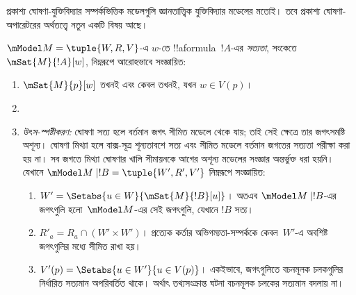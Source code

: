 \documentclass[../../../include/open-logic-section]{subfiles}
\begin{document}


প্রকাশ্য ঘোষণা-যুক্তিবিদ্যার সম্পর্কভিত্তিক মডেলগুলি জ্ঞানতাত্ত্বিক যুক্তিবিদ্যার মডেলের মতোই। তবে প্রকাশ্য ঘোষণা-অপারেটরের অর্থতত্ত্বে নতুন একটি বিষয় আছে।

\begin{defn} $\mModel M = \tuple{W, R, V}$-এ $w$-তে !!a{formula}~$!A$-এর \emph{সত্যতা}, সংকেতে
  $\mSat{M}{!A}[w]$, নিম্নরূপে আরোহভাবে সংজ্ঞায়িত:
  \begin{enumerate}
  \item $\mSat{M}{p}[w]$ তখনই এবং কেবল তখনই, যখন $w \in V(p)$।
  \item{}
  \item{}

  \emph{উৎস-স্পষ্টীকরণ:} ঘোষণা সত্য হলে বর্তমান জগৎ সীমিত মডেলে থেকে যায়; তাই সেই ক্ষেত্রে তার জগৎসমষ্টি অশূন্য। ঘোষণা মিথ্যা হলে বাক্স-সূত্র শূন্যতাবশে সত্য এবং সীমিত মডেলে বর্তমান জগতের সত্যতা পরীক্ষা করা হয় না। সব জগতে মিথ্যা ঘোষণার খালি সীমায়নকে আগের অশূন্য মডেলের সংজ্ঞার অন্তর্ভুক্ত ধরা হয়নি।
    যেখানে $\mModel M \mid !B = \tuple{W', R', V'}$ নিম্নরূপে সংজ্ঞায়িত:
  \begin{enumerate}
    \item $W' = \Setabs{ u \in W}{\mSat{M}{!B}[u]}$। অতএব $\mModel M \mid !B$-এর জগৎগুলি হলো~$\mModel M$-এর সেই জগৎগুলি, যেখানে $!B$ সত্য।
    \item $R'_a = R_a \cap (W' \times W')$। প্রত্যেক কর্তার অভিগম্যতা-সম্পর্ককে কেবল~$W'$-এ অবশিষ্ট জগৎগুলির মধ্যে সীমিত রাখা হয়।
    \item $V'(p) = \Setabs{ u \in W'}{u \in V(p) }$। একইভাবে, জগৎগুলিতে বচনমূলক চলকগুলির নির্ধারিত সত্যমান অপরিবর্তিত থাকে। অর্থাৎ তথ্যসংক্রান্ত ঘটনা বচনমূলক চলকের সত্যমান বদলায় না।
  \end{enumerate}


\end{enumerate}
\end{defn}
\end{document}
